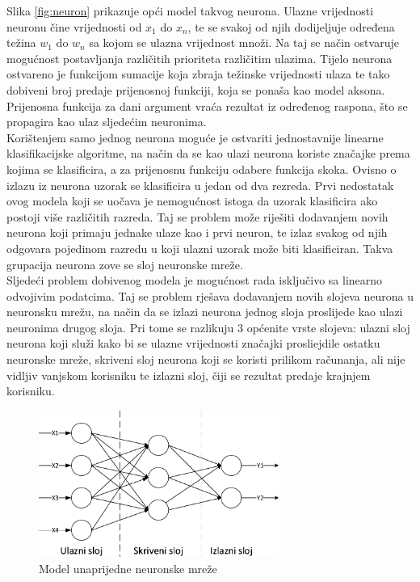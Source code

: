 \documentclass[times, utf8, zavrsni, numeric]{fer}
\begin{document}
Slika \ref{fig:neuron} prikazuje opći model takvog neurona. 
Ulazne vrijednosti neuronu čine vrijednosti od $x_1$ do $x_n$, te se svakoj od njih dodijeljuje određena težina $w_1$ do $w_n$ sa kojom se ulazna vrijednost množi.
Na taj se način ostvaruje mogućnost postavljanja različitih prioriteta različitim ulazima.
Tijelo neurona ostvareno je funkcijom sumacije koja zbraja težinske vrijednosti ulaza te tako dobiveni broj predaje prijenosnoj funkciji, koja se ponaša kao model aksona.
Prijenosna funkcija za dani argument vraća rezultat iz određenog raspona, što se propagira kao ulaz sljedećim neuronima.\\

Korištenjem samo jednog neurona moguće je ostvariti jednostavnije linearne klasifikacijske algoritme, na način da se kao ulazi neurona koriste značajke prema kojima se klasificira, a za prijenosnu funkciju odabere funkcija skoka.
Ovisno o izlazu iz neurona uzorak se klasificira u jedan od dva rezreda.
Prvi nedostatak ovog modela koji se uočava je nemogućnost istoga da uzorak klasificira ako postoji više različitih razreda.
Taj se problem može riješiti dodavanjem novih neurona koji primaju jednake ulaze kao i prvi neuron, te izlaz svakog od njih odgovara pojedinom razredu u koji ulazni uzorak može biti klasificiran.
Takva grupacija neurona zove se sloj neuronske mreže.\\

Sljedeći problem dobivenog modela je mogućnost rada isključivo sa linearno odvojivim podatcima. Taj se problem rješava dodavanjem novih slojeva neurona u neuronsku mrežu, na način da se izlazi neurona jednog sloja proslijede kao ulazi neuronima drugog sloja.
Pri tome se razlikuju $3$ općenite vrste slojeva: ulazni sloj neurona koji služi kako bi se ulazne vrijednosti značajki prosliejdile ostatku neuronske mreže, skriveni sloj neurona koji se koristi prilikom računanja, ali nije vidljiv vanjskom korisniku te izlazni sloj, čiji se rezultat predaje krajnjem korisniku.

\begin{figure}[ht!]
    \centering
    \includegraphics[width=0.7\textwidth]{Images/FFANN.pdf}
    \captionsetup{justification=centering}
    \caption{Model unaprijedne neuronske mreže}
    \label{fig:ffann}
\end{figure}
\end{document}

